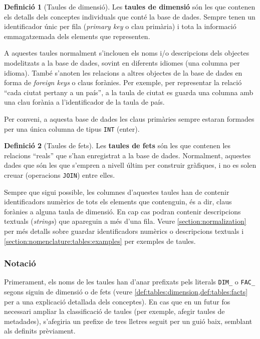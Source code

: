 \documentclass{article}
\theoremstyle{definition}
\newtheorem{definition}{Definició}
\begin{document}
\begin{definition}[Taules de dimensió]\label{def:tables:dimension}
  Les \textbf{taules de dimensió} són les que contenen els detalls dels conceptes individuals que conté la base de dades. Sempre tenen un identificador únic per fila (\emph{primary key} o clau primària) i tota la informació emmagatzemada dels elements que representen.
\end{definition}

A aquestes taules normalment s'inclouen els noms i/o descripcions dels objectes modelitzats a la base de dades, sovint en diferents idiomes (una columna per idioma). També s'anoten les relacions a altres objectes de la base de dades en forma de \emph{foreign keys} o claus forànies. Per exemple, per representar la relació ``cada ciutat pertany a un país'', a la taula de ciutat es guarda una columna amb una clau forània a l'identificador de la taula de país.

Per conveni, a aquesta base de dades les claus primàries sempre estaran formades per una única columna de tipus \verb|INT| (enter). 

\begin{definition}[Taules de fets]\label{def:tables:facts}
  Les \textbf{taules de fets} són les que contenen les relacions ``reals'' que s'han enregistrat a la base de dades. Normalment, aquestes dades que són les que s'empren a nivell últim per construir gràfiques, i no es solen creuar (operacions \verb|JOIN|) entre elles.
\end{definition}

Sempre que sigui possible, les columnes d'aquestes taules han de contenir identificadors numèrics de tots els elements que contenguin, és a dir, claus forànies a alguna taula de dimensió. En cap cas podran contenir descripcions textuals (\emph{strings}) que apareguin a més d'una fila. Veure \cref{section:normalization} per més detalls sobre guardar identificadors numèrics o descripcions textuals i \cref{section:nomenclature:tables:examples} per exemples de taules.

\subsubsection{Notació}\label{section:nomenclature:tables:notation}
Primerament, els noms de les taules han d'anar prefixats pels literals \verb|DIM_| o \verb|FAC_| segons siguin de dimensió o de fets (veure \cref{def:tables:dimension,def:tables:facts} per a una explicació detallada dels conceptes). En cas que en un futur fos necessari ampliar la classificació de taules (per exemple, afegir taules de metadades), s'afegiria un prefixe de tres lletres seguit per un guió baix, semblant als definits prèviament.
\end{document}
